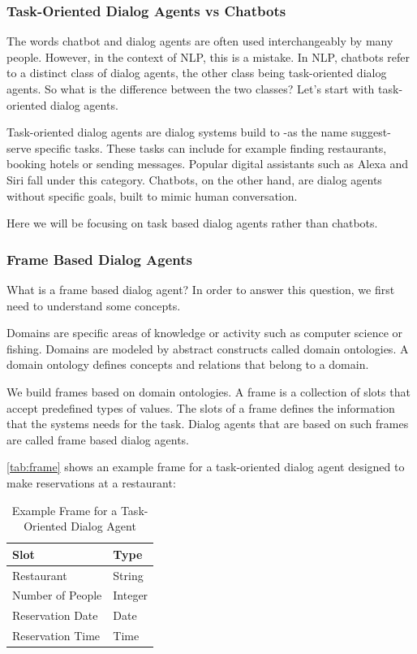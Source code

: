 \subsubsection{Task-Oriented Dialog Agents vs Chatbots}
The words chatbot and dialog agents are often used interchangeably by many people.
However, in the context of NLP, this is a mistake.
In NLP, chatbots refer to a distinct class of dialog agents, the other class being task-oriented dialog agents.
So what is the difference between the two classes? 
Let's start with task-oriented dialog agents.

Task-oriented dialog agents are dialog systems build to -as the name suggest- serve specific tasks.
These tasks can include for example finding restaurants, booking hotels or sending messages.
Popular digital assistants such as Alexa and Siri fall under this category.
Chatbots, on the other hand, are dialog agents without specific goals, built to mimic human conversation.

Here we will be focusing on task based dialog agents rather than chatbots.

\subsubsection{Frame Based Dialog Agents}
What is a frame based dialog agent?
In order to answer this question, we first need to understand some concepts.

Domains are specific areas of knowledge or activity such as computer science or fishing.
Domains are modeled by abstract constructs called domain ontologies.
A domain ontology defines concepts and relations that belong to a domain.

We build frames based on domain ontologies.
A frame is a collection of slots that accept predefined types of values.
The slots of a frame defines the information that the systems needs for the task.
Dialog agents that are based on such frames are called frame based dialog agents.

\autoref{tab:frame} shows an example frame for a task-oriented dialog agent designed to make reservations at a restaurant:

\begin{table}[htbp]
  \caption[Example Frame for a Task-Oriented Dialog Agent]{Example Frame for a Task-Oriented Dialog Agent}\label{tab:frame}
  \centering
  \begin{tabular}{l|l}
    Slot&Type\\ \toprule
    Restaurant&String\\ \hline
    Number of People&Integer\\ \hline
    Reservation Date&Date\\ \hline
    Reservation Time&Time\\ \hline
  \end{tabular}
\end{table}

